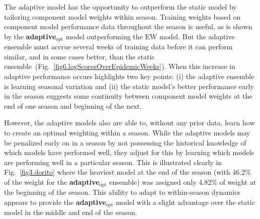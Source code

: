 \documentclass[sagev,times,Review,10pt]{sagej}
\def\adaptOpt{\textbf{adaptive$_{\text{opt}}$ }}
\begin{document}
The adaptive model has the opportunity to outperform the static model by tailoring component model weights within season.
Training weights based on component model performance data throughout the season is useful, as is shown by the \adaptOpt model outperforming the EW model.
But the adaptive ensemble must accrue several weeks of training data before it can perform similar, and in some cases better, than the static ensemble~(Fig.~\ref{fig6.logScoresOverEpidemicWeeks}).
When this increase in adaptive performance occurs highlights two key points: (i) the adaptive ensemble is learning seasonal variation and (ii) the static model's better performance early in the season suggests some continuity between component model weights at the end of one season and beginning of the next.


However, the adaptive models also are able to, without any prior data, learn how to create an optimal weighting within a season. 
While the adaptive models may be penalized early on in a season by not possessing the historical knowledge of which models have performed well, they adjust for this by learning which models are performing well in a particular season. 
This is illustrated clearly in Fig.~\ref{fig3.dorito} where the heaviest model at the end of the season (with 46.2\% of the weight for the \adaptOpt ensemble) was assigned only 4.82\% of weight at the beginning of the season. 
This ability to adapt to within-season dynamics appears to provide the \adaptOpt model with a slight advantage over the static model in the middle and end of the season.
\end{document}
